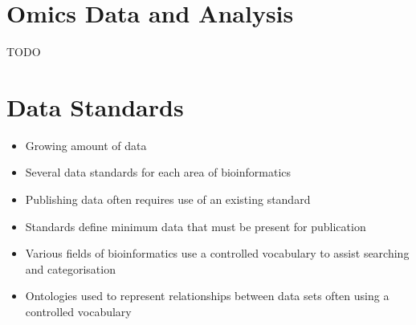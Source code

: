 \documentclass[a4paper]{article}
\begin{document}
\section{Omics Data and Analysis}

TODO

\section{Data Standards}

\begin{itemize}
  \item
    Growing amount of data

  \item
    Several data standards for each area of bioinformatics

  \item
    Publishing data often requires use of an existing standard

  \item
    Standards define minimum data that must be present for publication

  \item
    Various fields of bioinformatics use a controlled vocabulary to assist
    searching and categorisation

  \item
    Ontologies used to represent relationships between data sets often using a
    controlled vocabulary
\end{itemize}
\end{document}
